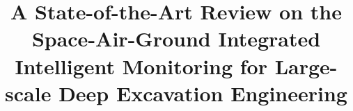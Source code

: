 \documentclass[preprint,11pt,authoryear,3p]{elsarticle}
\begin{document}
\setlength{\abovedisplayskip}{-15pt}
\setlength{\belowdisplayskip}{-0pt}

\begin{frontmatter}



\title{A State-of-the-Art Review on the Space-Air-Ground Integrated Intelligent Monitoring for Large-scale Deep Excavation Engineering}





\end{frontmatter}
\end{document}

